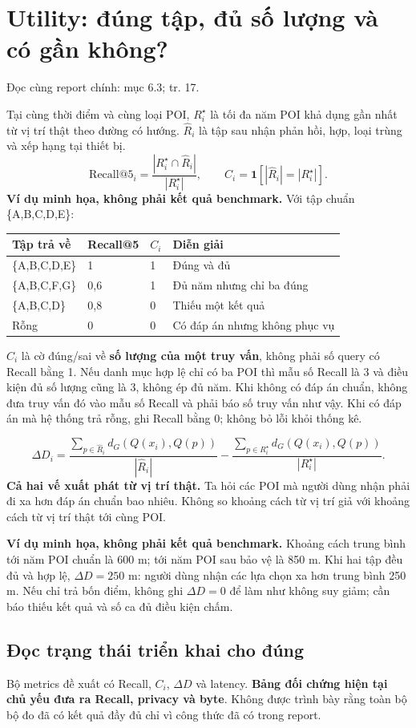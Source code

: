 \documentclass[10pt,a4paper]{article}
\newcommand{\where}[1]{\par{\small\color{gray}Đọc cùng report chính: #1.}\par}
\newcommand{\example}{\textbf{Ví dụ minh họa, không phải kết quả benchmark.} }
\newcommand{\guidepage}[1]{\clearpage\section{#1}}
\begin{document}
\guidepage{Utility: đúng tập, đủ số lượng và có gần không?}
\where{mục 6.3; tr. 17}
Tại cùng thời điểm và cùng loại POI, $R_i^\star$ là tối đa năm POI khả dụng gần nhất từ vị trí thật theo đường có hướng. $\widehat R_i$ là tập sau nhận phản hồi, hợp, loại trùng và xếp hạng tại thiết bị.
\[
\mathrm{Recall@5}_i=\frac{|R_i^\star\cap\widehat R_i|}{|R_i^\star|},\qquad
C_i=\mathbf1[|\widehat R_i|=|R_i^\star|].
\]
\example Với tập chuẩn \{A,B,C,D,E\}:
\begin{longtable}{@{}P{6.1cm}P{3.0cm}P{2.2cm}P{4.7cm}@{}}
\toprule Tập trả về & Recall@5 & $C_i$ & Diễn giải\\\midrule
\{A,B,C,D,E\} & 1 & 1 & Đúng và đủ\\[3pt]
\{A,B,C,F,G\} & 0,6 & 1 & Đủ năm nhưng chỉ ba đúng\\[3pt]
\{A,B,C,D\} & 0,8 & 0 & Thiếu một kết quả\\[3pt]
Rỗng & 0 & 0 & Có đáp án nhưng không phục vụ\\
\bottomrule
\end{longtable}
$C_i$ là cờ đúng/sai về \textbf{số lượng của một truy vấn}, không phải số query có Recall bằng 1. Nếu danh mục hợp lệ chỉ có ba POI thì mẫu số Recall là 3 và điều kiện đủ số lượng cũng là 3, không ép đủ năm.
Khi không có đáp án chuẩn, không đưa truy vấn đó vào mẫu số Recall và phải báo số truy vấn như vậy. Khi có đáp án mà hệ thống trả rỗng, ghi Recall bằng 0; không bỏ lỗi khỏi thống kê.

\[
\Delta D_i=\frac{\sum_{p\in\widehat R_i}d_G(Q(x_i),Q(p))}{|\widehat R_i|}
-\frac{\sum_{p\in R_i^\star}d_G(Q(x_i),Q(p))}{|R_i^\star|}.
\]
\textbf{Cả hai vế xuất phát từ vị trí thật.} Ta hỏi các POI mà người dùng nhận phải đi xa hơn đáp án chuẩn bao nhiêu. Không so khoảng cách từ vị trí giả với khoảng cách từ vị trí thật tới cùng POI.

\example Khoảng cách trung bình tới năm POI chuẩn là 600 m; tới năm POI sau bảo vệ là 850 m. Khi hai tập đều đủ và hợp lệ, $\Delta D=250$ m: người dùng nhận các lựa chọn xa hơn trung bình 250 m. Nếu chỉ trả bốn điểm, không ghi $\Delta D=0$ để làm như không suy giảm; cần báo thiếu kết quả và số ca đủ điều kiện chấm.

\subsection*{Đọc trạng thái triển khai cho đúng}
Bộ metrics đề xuất có Recall, $C_i$, $\Delta D$ và latency. \textbf{Bảng đối chứng hiện tại chủ yếu đưa ra Recall, privacy và byte}. Không được trình bày rằng toàn bộ bộ đo đã có kết quả đầy đủ chỉ vì công thức đã có trong report.
\end{document}
